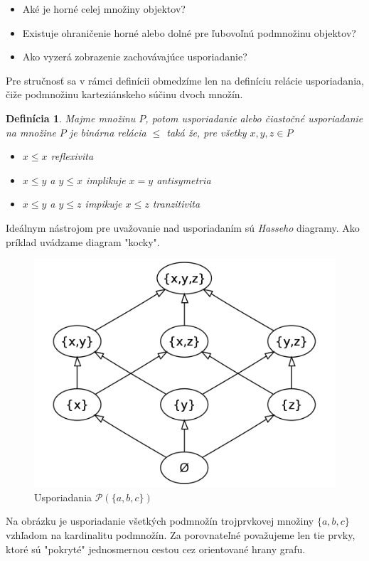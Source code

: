 \documentclass[a4paper,10pt,oneside]{report}%
\newtheorem{definition}{Definícia}[chapter]
\begin{document}
\begin{itemize}
    \item Aké je horné celej množiny objektov?
    \item Existuje ohraničenie horné alebo dolné pre ľubovoľnú podmnožinu objektov?
    \item Ako vyzerá zobrazenie zachovávajúce usporiadanie?
\end{itemize}
    Pre stručnosť sa v rámci definícii obmedzíme len na definíciu relácie usporiadania,
čiže podmnožinu karteziánskeho súčinu dvoch množín.
\begin{definition}
    Majme množinu $P$, potom usporiadanie alebo čiastočné usporiadanie na množine
    $P$ je binárna relácia $\leq$ taká že, pre všetky $x,y,z \in P$
    \begin{itemize}
        \item $x \leq x$ reflexivita
        \item $x \leq y$ a $y \leq x$ implikuje $x = y$ antisymetria
        \item $x \leq y$ a $y \leq z$ impikuje $x \leq z$ tranzitivita
    \end{itemize}
\end{definition}
    Ideálnym nástrojom pre uvažovanie nad usporiadaním sú \emph{Hasseho} diagramy.
    Ako príklad uvádzame diagram "kocky".
\begin{figure}[!ht]
    \centering
    \includegraphics[scale=0.20]{cube.png}
    \caption{Usporiadania $\mathcal{P}(\{a,b,c\})$}
\end{figure}

    Na obrázku je usporiadanie všetkých podmnožín trojprvkovej množiny $\{ a,b,c \}$
vzhľadom na kardinalitu podmnožín.
    Za porovnateľné považujeme len tie prvky, ktoré sú "pokryté" jednosmernou cestou 
cez orientované hrany grafu.
\end{document}
